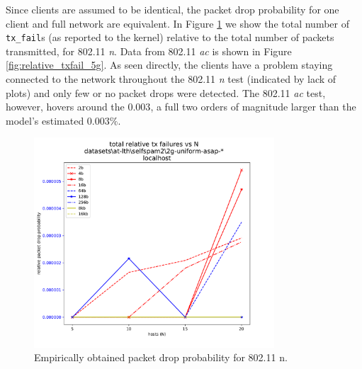 Since clients are assumed to be identical, the packet drop probability for one
client and full network are equivalent. In Figure \ref{fig:relative_txfail_2g}
we show the total number of \texttt{tx\_fail}s (as reported to the kernel)
relative to the total number of packets transmitted, for 802.11 \emph{n}. Data
from 802.11 \emph{ac} is shown in Figure \ref{fig:relative_txfail_5g}. As seen
directly, the clients have a problem staying connected to the network throughout
the 802.11 \emph{n} test (indicated by lack of plots) and only few or no
packet drops were detected. The 802.11 \emph{ac} test, however, hovers around
the $0.003$, a full two orders of magnitude larger than the model's estimated
$0.003\%$.

\begin{figure}[tbp]
  \centering
  \includegraphics[width=0.8\textwidth]{images/relative_tx_fail_2g.pdf}
  \caption{Empirically obtained packet drop probability for 802.11 n.}
  \label{fig:relative_txfail_2g}
\end{figure}

